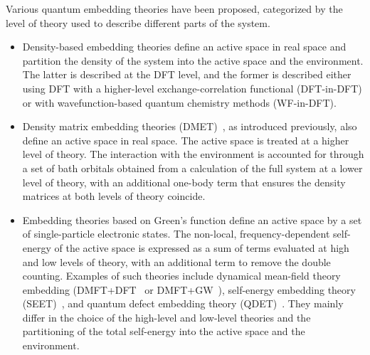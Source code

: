 Various quantum embedding theories have been proposed, categorized by the level of theory used to describe different parts of the system.
\begin{itemize}
\item Density-based embedding theories define an active space in real space and partition the density of the system into the active space and the environment. The latter is described at the DFT level, and the former is described either using DFT with a higher-level exchange-correlation functional (DFT-in-DFT) or with wavefunction-based quantum chemistry methods (WF-in-DFT).
%
\item Density matrix embedding theories (DMET)~\cite{knizia_density_2012,knizia_density_2013,wouters_practical_2016,pham_can_2018,hermes_multiconfigurational_2019,pham_periodic_2020,cui_efficient_2020,lau_regional_2021,cui_systematic_2022,mitra_density_2023}, as introduced previously, also define an active space in real space. The active space is treated at a higher level of theory. The interaction with the environment is accounted for through a set of bath orbitals obtained from a calculation of the full system at a lower level of theory, with an additional one-body term that ensures the density matrices at both levels of theory coincide.
%
\item Embedding theories based on Green's function define an active space by a set of single-particle electronic states. The non-local, frequency-dependent self-energy of the active space is expressed as a sum of terms evaluated at high and low levels of theory, with an additional term to remove the double counting. Examples of such theories include dynamical mean-field theory embedding (DMFT+DFT~\cite{anisimov_first-principles_1997,lichtenstein_ab_1998} or DMFT+GW~\cite{sun_extended_2002,biermann_first-principles_2003,biermann_dynamical_2014,boehnke_when_2016,choi_first-principles_2016,nilsson_multitier_2017}), self-energy embedding theory (SEET)~\cite{lan_generalized_2017,zgid_finite_2017,rusakov_self-energy_2019}, and quantum defect embedding theory (QDET)~\cite{ma_first-principles_2020,ma_quantum_2020,ma_quantum_2021,sheng_greens_2022}. They mainly differ in the choice of the high-level and low-level theories and the partitioning of the total self-energy into the active space and the environment.
\end{itemize}


